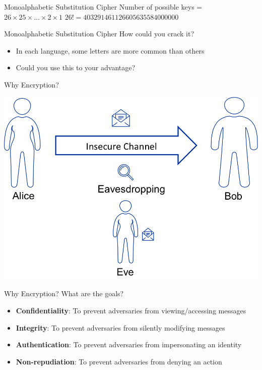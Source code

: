\documentclass{beamer}
\begin{document}
\begin{frame}{Monoalphabetic Substitution Cipher}
 Number of possible keys = \( 26\times25\times ... \times2\times1\)
 \newline
\(26! = 403 291 461 126 605 635 584 000 000\)
\end{frame}

\begin{frame}{Monoalphabetic Substitution Cipher}
How could you crack it?
\begin{itemize}
\item In each language, some letters are more common than others
\item Could you use this to your advantage?
\end{itemize}
\end{frame}

\begin{frame}{Why Encryption?}
\begin{center}
	\includegraphics[width=0.7\linewidth]{insecure-channel.png}
\end{center}
\end{frame}

\begin{frame}{Why Encryption?}
What are the goals? 
\begin{itemize}
  \item \textbf{Confidentiality}: To prevent adversaries from viewing/accessing messages
  \item \textbf{Integrity}: To prevent adversaries from silently modifying messages
  \item \textbf{Authentication}: To prevent adversaries from impersonating an identity
  \item \textbf{Non-repudiation}: To prevent adversaries from denying an action
\end{itemize}
\end{frame}
\end{document}

